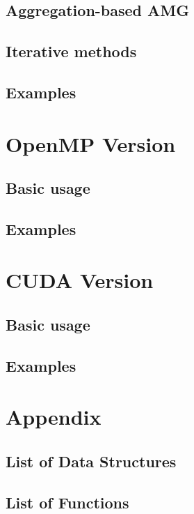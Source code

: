 \documentclass[11pt]{memoir}
\begin{document}
\section{Aggregation-based AMG}

\section{Iterative methods}

\section{Examples}

\chapter{OpenMP Version}\label{ch:omp}

\section{Basic usage}

\section{Examples}

\chapter{CUDA Version}\label{ch:cuda}

\section{Basic usage}

\section{Examples}

\chapter{Appendix}\label{ch:append}

\section{List of Data Structures}

\section{List of Functions}


\newpage


\end{document}
